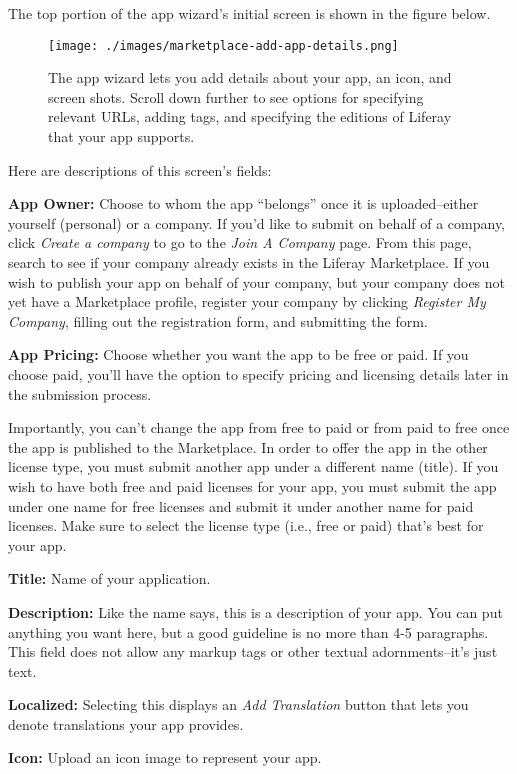 The top portion of the app wizard's initial screen is shown in the
figure below.

\begin{figure}
\centering
\texttt{[image: ./images/marketplace-add-app-details.png]}
\caption{The app wizard lets you add details about your app, an icon,
and screen shots. Scroll down further to see options for specifying
relevant URLs, adding tags, and specifying the editions of Liferay that
your app supports.}
\end{figure}

Here are descriptions of this screen's fields:

\textbf{App Owner:} Choose to whom the app ``belongs'' once it is
uploaded--either yourself (personal) or a company. If you'd like to
submit on behalf of a company, click \emph{Create a company} to go to
the \emph{Join A Company} page. From this page, search to see if your
company already exists in the Liferay Marketplace. If you wish to
publish your app on behalf of your company, but your company does not
yet have a Marketplace profile, register your company by clicking
\emph{Register My Company}, filling out the registration form, and
submitting the form.

\textbf{App Pricing:} Choose whether you want the app to be free or
paid. If you choose paid, you'll have the option to specify pricing and
licensing details later in the submission process.

Importantly, you can't change the app from free to paid or from paid to
free once the app is published to the Marketplace. In order to offer the
app in the other license type, you must submit another app under a
different name (title). If you wish to have both free and paid licenses
for your app, you must submit the app under one name for free licenses
and submit it under another name for paid licenses. Make sure to select
the license type (i.e., free or paid) that's best for your app.

\textbf{Title:} Name of your application.

\textbf{Description:} Like the name says, this is a description of your
app. You can put anything you want here, but a good guideline is no more
than 4-5 paragraphs. This field does not allow any markup tags or other
textual adornments--it's just text.

\textbf{Localized:} Selecting this displays an \emph{Add Translation}
button that lets you denote translations your app provides.

\textbf{Icon:} Upload an icon image to represent your app.

